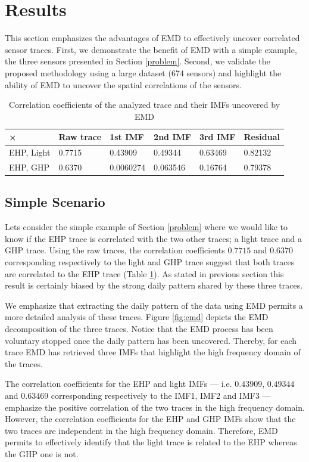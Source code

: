 \section{Results}
This section emphasizes the advantages of EMD to effectively uncover correlated sensor traces.
First, we demonstrate the benefit of EMD with a simple example, the three sensors presented in Section \ref{problem}.
Second, we validate the proposed methodology using a large dataset (674 sensors) and highlight the ability of EMD to uncover the spatial correlations of the sensors.

\begin{table}
\begin{center}
\begin{tabular}{|l|l|l|l|l|l|}
\hline
× & Raw trace & 1st IMF & 2nd IMF & 3rd IMF & Residual\\ \hline
EHP, Light & 0.7715 & 0.43909 & 0.49344 & 0.63469 & 0.82132 \\ \hline
EHP, GHP & 0.6370 & 0.0060274 & 0.063546 & 0.16764 & 0.79378 \\ \hline
\end{tabular}
\caption{Correlation coefficients of the analyzed trace and their IMFs uncovered by EMD}
\label{tab:corr}
\end{center}
\end{table}
\subsection{Simple Scenario}

Lets consider the simple example of Section \ref{problem} where we would like to know if the EHP trace is correlated with the two other traces; a light trace and a GHP trace.
Using the raw traces, the correlation coefficients $0.7715$ and $0.6370$ corresponding respectively to the light and GHP trace suggest that both traces are correlated to the EHP trace (Table \ref{tab:corr}).
As stated in previous section this result is certainly biased by the strong daily pattern shared by these three traces.

We emphasize that extracting the daily pattern of the data using EMD permits a more detailed analysis of these traces.
Figure \ref{fig:emd} depicts the EMD decomposition of the three traces.
Notice that the EMD process has been voluntary stopped once the daily pattern has been uncovered.
Thereby, for each trace EMD has retrieved three IMFs that highlight the high frequency domain of the traces.

The correlation coefficients for the EHP and light IMFs --- i.e. $0.43909$, $0.49344$ and $0.63469$ corresponding respectively to the IMF1, IMF2 and IMF3 --- emphasize the positive correlation of the two traces in the high frequency domain.
However, the correlation coefficients for the EHP and GHP IMFs show that the two traces are independent in the high frequency domain.
Therefore, EMD permits to effectively identify that the light trace is related to the EHP whereas the GHP one is not.

